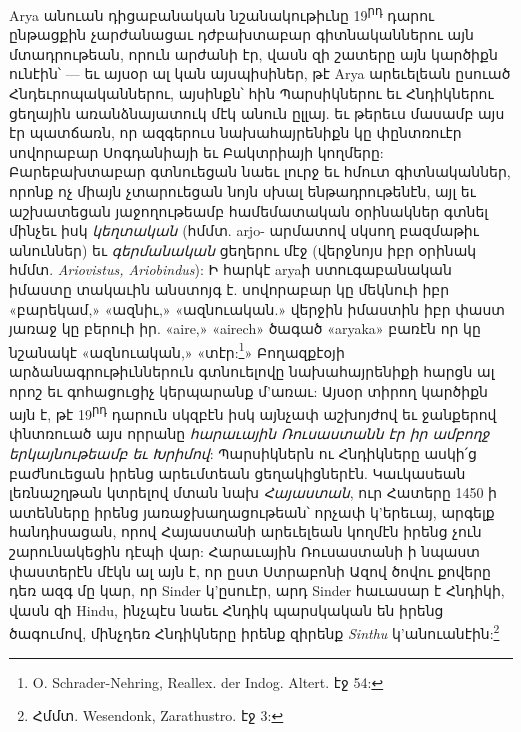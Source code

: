 \documentclass{article}
\begin{document}
{Arya անուան դիցաբանական նշանակութիւնը 19\textsuperscript{րդ} դարու ընթացքին չարժանացաւ դժբախտաբար գիտնականներու այն մտադրութեան, որուն արժանի էր, վասն զի շատերը այն կարծիքն ունէին՝ — եւ այսօր ալ կան այսպիսիներ, թէ Arya արեւելեան ըսուած Հնդեւրոպականներու, այսինքն՝ հին Պարսիկներու եւ Հնդիկներու ցեղային առանձնայատուկ մէկ անուն ըլլայ. եւ թերեւս մասամբ այս էր պատճառն, որ ազգերուս նախահայրենիքն կը փընտռուէր սովորաբար Սոգդանիայի եւ Բակտրիայի կողմերը: Բարեբախտաբար գտնուեցան նաեւ լուրջ եւ հմուտ գիտնականներ, որոնք ոչ միայն չտարուեցան նոյն սխալ ենթադրութենէն, այլ եւ աշխատեցան յաջողութեամբ համեմատական օրինակներ գտնել մինչեւ իսկ \emph{կեղտական} (հմմտ. arjo- արմատով սկսող բազմաթիւ անուններ) եւ \emph{գերմանական} ցեղերու մէջ (վերջնոյս իբր օրինակ հմմտ. \emph{Ariovistus, Ariobindus}): Ի հարկէ aryaի ստուգաբանական իմաստը տակաւին անստոյգ է. սովորաբար կը մեկնուի իբր «բարեկամ,» «ազնիւ,» «ազնուական.» վերջին իմաստին իբր փաստ յառաջ կը բերուի իր. «aire,» «airech» ծագած «aryaka» բառէն որ կը նշանակէ «ազնուական,» «տէր:\footnote{O. Schrader-Nehring, Reallex. der Indog. Altert. էջ 54:}» Բողազքէօյի արձանագրութիւններուն գտնուելովը նախահայրենիքի հարցն ալ որոշ եւ գոհացուցիչ կերպարանք մ'առաւ: Այսօր տիրող կարծիքն այն է, թէ 19\textsuperscript{րդ} դարուն սկզբէն իսկ այնչափ աշխոյժով եւ ջանքերով փնտռուած այս որրանը \emph{հարաւային Ռուսաստանն էր իր ամբողջ երկայնութեամբ եւ Խրիմով}: Պարսիկներն ու Հնդիկները ասկի՛ց բաժնուեցան իրենց արեւմտեան ցեղակիցներէն. Կաւկասեան լեռնաշղթան կտրելով մտան նախ \emph{Հայաստան}, ուր Հատերը 1450 ի ատենները իրենց յառաջխաղացութեան՝ որչափ կ'երեւայ, արգելք հանդիսացան, որով Հայաստանի արեւելեան կողմէն իրենց չուն շարունակեցին դէպի վար: Հարաւային Ռուսաստանի ի նպաստ փաստերէն մէկն ալ այն է, որ ըստ Ստրաբոնի Ազով ծովու քովերը դեռ ազգ մը կար, որ Sinder կ'ըսուէր, արդ Sinder հաւասար է Հնդիկի, վասն զի Hindu, ինչպէս նաեւ Հնդիկ պարսկական են իրենց ծագումով, մինչդեռ Հնդիկները իրենք զիրենք \emph{Sinthu} կ'անուանէին:\footnote{Հմմտ. Wesendonk, Zarathustro. էջ 3:}

}
\end{document}
